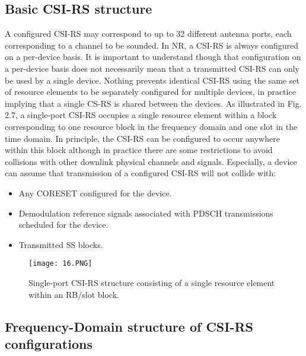 \subsection{Basic CSI-RS structure}

A configured CSI-RS may correspond to up to 32 different antenna ports, each corresponding to a channel to be sounded. In NR, a CSI-RS is always configured on a per-device basis. It is important to understand though that configuration on a per-device basis does not necessarily mean that a transmitted CSI-RS can only be used by a single device. Nothing prevents identical CSI-RS using the same set of resource elements to be separately configured for multiple devices, in practice implying that a single CS-RS is shared between the devices.
\newline
As illustrated in Fig. 2.7, a single-port CSI-RS occupies a single resource element within a block corresponding to one resource block in the frequency domain and one slot in the time domain. In principle, the CSI-RS can be configured to occur anywhere within this block although in practice there are some restrictions to avoid collisions with other downlink physical channels and signals. Especially, a device can assume that transmission of a configured CSI-RS will not collide with:
\begin{itemize}
    \item Any CORESET configured for the device.
    \item Demodulation reference signals associated with PDSCH transmissions scheduled for the device. 
    \item Transmitted SS blocks.
\end{itemize}

\begin{figure}[h]
\centering
\texttt{[image: 16.PNG]}
\caption{Single-port CSI-RS structure consisting of a single resource element within an RB/slot block. }
\end{figure}


\subsection{Frequency-Domain structure of CSI-RS configurations}

